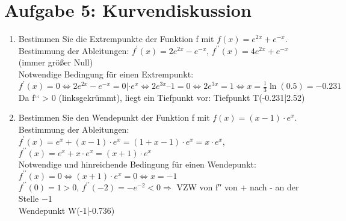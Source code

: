 \documentclass[11pt,a4paper, parskip=half ]{report}
\begin{document}
  \section*{Aufgabe 5: Kurvendiskussion}
\begin{enumerate}
  \item Bestimmen Sie die Extrempunkte der Funktion f mit $f(x) = e^{2x} + e^{-x}$.
  \vspace{20pt}
  \\Bestimmung der Ableitungen:	$f^{\prime}(x) =  2e^{2x} - e^{-x}$, $f^{\prime\prime}(x) =  4e^{2x} + e^{-x}$	(immer größer Null)\\
	Notwendige Bedingung für einen Extrempunkt:\\  
			$f^{\prime}(x) = 0	\Leftrightarrow  2e^{2x} - e^{-x} = 0 |\cdot e^x  	\Leftrightarrow 2e^{3x} – 1 = 0  \Leftrightarrow     2e^{3x} = 1
			\Leftrightarrow x= \frac{1}{3} \ln(0.5) = -0.231$\\				
	Da f‘‘ > 0 (linksgekrümmt), liegt ein Tiefpunkt vor:	Tiefpunkt T(-0.231|2.52) 

  \item Bestimmen Sie den Wendepunkt der Funktion f mit $f(x) = (x-1)\cdot e^x$.
  \vspace{20pt}
  \\Bestimmung der Ableitungen:  $f^{\prime}(x) = e^x + (x-1)\cdot e^x = (1+x-1)\cdot e^x = x\cdot e^x$, $f^{\prime\prime}(x) = e^x + x\cdot e^x = (x+1)\cdot e^x$	
  \\Notwendige und hinreichende Bedingung für einen Wendepunkt:  
  \\$f^{\prime\prime}(x) = 0	\Leftrightarrow   (x +1)\cdot e^x = 0   \Leftrightarrow x = -1$
  \\$f^{\prime\prime}(0) = 1> 0$, $f^{\prime\prime}(-2) = -e^{-2}< 0   \Rightarrow$ VZW von f′′ von + nach - an der Stelle \num{-1}	
  \\Wendepunkt W(-1|-0.736) 	

\end{enumerate}
\end{document}
